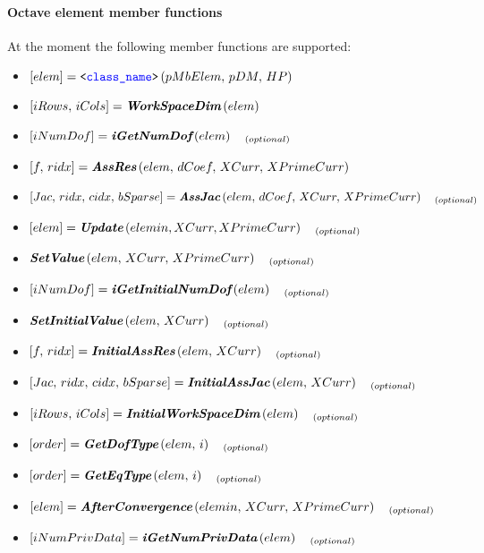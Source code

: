 \paragraph{Octave element member functions}
At the moment the following member functions are supported:
\begin{itemize}
\item $\left[elem\right] = \texttt{<\textcolor{blue}{class\_name}>}\left(pMbElem,\,pDM,\,HP\right)$
\item $\left[iRows,\,iCols\right] = \textit{\textbf{WorkSpaceDim}}\left(elem\right)$
\item $\left[iNumDof\right] = \textit{\textbf{iGetNumDof}}\left(elem\right)\quad_{(optional)}$
\item $\left[f,\,ridx\right] = \textit{\textbf{AssRes}}\left(elem,\,dCoef,\,XCurr,\,XPrimeCurr\right)$
\item $\left[Jac,\,ridx,\,cidx,\,bSparse\right] = \textit{\textbf{AssJac}}\left(elem,\,dCoef,\,XCurr,\,XPrimeCurr\right)\quad_{(optional)}$
\item $\left[elem\right] = \textit{\textbf{Update}}\left(elemin, XCurr, XPrimeCurr\right)\quad_{(optional)}$
\item $\textit{\textbf{SetValue}}\left(elem,\,XCurr,\,XPrimeCurr\right)\quad_{(optional)}$
\item $\left[iNumDof\right] = \textit{\textbf{iGetInitialNumDof}}\left(elem\right)\quad_{(optional)}$
\item $\textit{\textbf{SetInitialValue}}\left(elem,\,XCurr\right)\quad_{(optional)}$
\item $\left[f,\,ridx\right] = \textit{\textbf{InitialAssRes}}\left(elem,\,XCurr\right)\quad_{(optional)}$
\item $\left[Jac,\,ridx,\,cidx,\,bSparse\right] = \textit{\textbf{InitialAssJac}}\left(elem,\,XCurr\right)\quad_{(optional)}$
\item $\left[iRows,\,iCols\right] = \textit{\textbf{InitialWorkSpaceDim}}\left(elem\right)\quad_{(optional)}$
\item $\left[order\right] = \textit{\textbf{GetDofType}}\left(elem,\,i\right)\quad_{(optional)}$
\item $\left[order\right] = \textit{\textbf{GetEqType}}\left(elem,\,i\right)\quad_{(optional)}$
\item $\left[elem\right] = \textit{\textbf{AfterConvergence}}\left(elemin,\,XCurr,\,XPrimeCurr\right)\quad_{(optional)}$
\item $\left[iNumPrivData\right] = \textit{\textbf{iGetNumPrivData}}\left(elem\right)\quad_{(optional)}$

\end{itemize}
